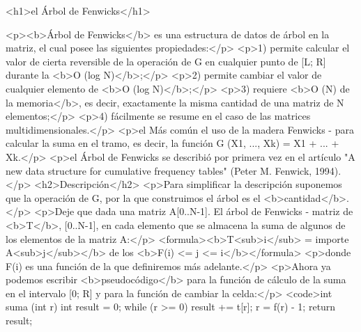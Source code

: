 <h1>el Árbol de Fenwicks</h1>

<p><b>Árbol de Fenwicks</b> es una estructura de datos de árbol en la matriz, el cual posee las siguientes propiedades:</p>
<p>1) permite calcular el valor de cierta reversible de la operación de G en cualquier punto de [L; R] durante la <b>O (log N)</b>;</p>
<p>2) permite cambiar el valor de cualquier elemento de <b>O (log N)</b>;</p>
<p>3) requiere <b>O (N) de la memoria</b>, es decir, exactamente la misma cantidad de una matriz de N elementos;</p>
<p>4) fácilmente se resume en el caso de las matrices multidimensionales.</p>
<p>el Más común el uso de la madera Fenwicks - para calcular la suma en el tramo, es decir, la función G (X1, ..., Xk) = X1 + ... + Xk.</p>
<p>el Árbol de Fenwicks se describió por primera vez en el artículo "A new data structure for cumulative frequency tables" (Peter M. Fenwick, 1994).</p>
<h2>Descripción</h2>
<p>Para simplificar la descripción suponemos que la operación de G, por la que construimos el árbol es el <b>cantidad</b>.</p>
<p>Deje que dada una matriz A[0..N-1]. El árbol de Fenwicks - matriz de <b>T</b>, [0..N-1], en cada elemento que se almacena la suma de algunos de los elementos de la matriz A:</p>
<formula><b>T<sub>i</sub> = importe A<sub>j</sub></b> de los <b>F(i) <= j <= i</b></formula>
<p>donde F(i) es una función de la que definiremos más adelante.</p>
<p>Ahora ya podemos escribir <b>pseudocódigo</b> para la función de cálculo de la suma en el intervalo [0; R] y para la función de cambiar la celda:</p>
<code>int suma (int r)
{
int result = 0;
while (r >= 0) {
result += t[r];
r = f(r) - 1;
}
return result;
}

